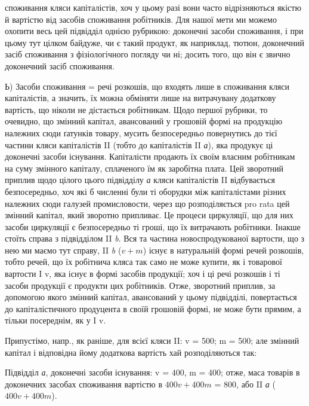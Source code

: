 \parcont{}  %
споживання кляси капіталістів, хоч у цьому разі вони часто відрізняються
якістю й вартістю від засобів споживання робітників. Для нашої мети
ми можемо охопити весь цей підвідділ однією рубрикою: доконечні
засоби споживання, і при цьому тут цілком байдуже, чи є такий продукт,
як наприклад, тютюн, доконечний засіб споживання з фізіологічного
погляду чи ні; досить того, що він є звично доконечний засіб споживання.

Ь) Засоби споживання = речі розкошів, що входять лише в
споживання кляси капіталістів, а значить, їх можна обміняти лише на
витрачувану додаткову вартість, що ніколи не дістається робітникам.
Щодо першої рубрики, то очевидно, що змінний капітал, авансований у
грошовій формі на продукцію належних сюди ґатунків товару, мусить
безпосередньо повернутись до тієї частини кляси капіталістів II (тобто
до капіталістів II \emph{а}), яка продукує ці доконечні засоби існування. Капіталісти
продають їх своїм власним робітникам на суму змінного капіталу,
сплаченого їм як заробітна плата. Цей зворотний приплив щодо цілого
цього підвідділу \emph{а} кляси капіталістів II відбувається безпосередньо,
хоч які б численні були ті оборудки між капіталістами різних належних
сюди галузей промисловости, через що розподіляється pro rata
цей змінний капітал, який зворотно припливає. Це процеси циркуляції,
що для них засоби циркуляції є безпосередньо ті гроші, що їх витрачають
робітники. Інакше стоїть справа з підвідділом II \emph{b}. Вся та частина
новоспродукованої вартости, що з нею ми маємо тут справу, II \emph{b} ($v + m$)
існує в натуральній формі речей розкошів, тобто речей, що їх робітнича
кляса так само не може купити, як і товарової вартости I v, яка існує
в формі засобів продукції; хоч і ці речі розкошів і ті засоби продукції
є продукти цих робітників. Отже, зворотний приплив, за допомогою
якого змінний капітал, авансований у цьому підвідділі, повертається до
капіталістичного продуцента в своїй грошовій формі, не може бути
прямим, а тільки посереднім, як у I v.

Припустімо, напр., як раніше, для всієї кляси II: v = 500; m = 500;
але змінний капітал і відповідна йому додаткова вартість хай розподіляються
так:

Підвідділ \emph{а}, доконечні засоби існування: v = 400, m = 400; отже,
маса товарів в доконечних засобах споживання вартістю в $400 v + 400 m$
= 800, або II \emph{а} ($400 v + 400 m$).

